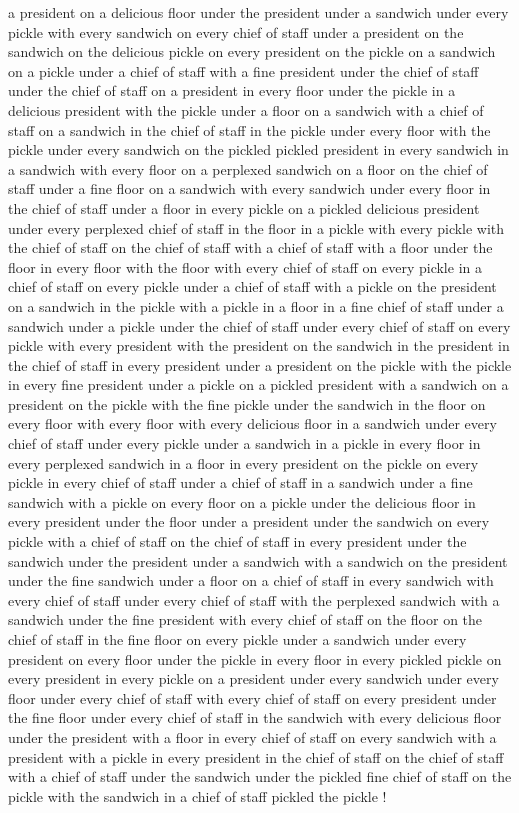 \documentclass[10pt]{article}
\begin{document}
\begin{enumerate}
{a president on a delicious floor under the president under a sandwich under every pickle with every sandwich on every chief of staff under a president on the sandwich on the delicious pickle on every president on the pickle on a sandwich on a pickle under a chief of staff with a fine president under the chief of staff under the chief of staff on a president in every floor under the pickle in a delicious president with the pickle under a floor on a sandwich with a chief of staff on a sandwich in the chief of staff in the pickle under every floor with the pickle under every sandwich on the pickled pickled president in every sandwich in a sandwich with every floor on a perplexed sandwich on a floor on the chief of staff under a fine floor on a sandwich with every sandwich under every floor in the chief of staff under a floor in every pickle on a pickled delicious president under every perplexed chief of staff in the floor in a pickle with every pickle with the chief of staff on the chief of staff with a chief of staff with a floor under the floor in every floor with the floor with every chief of staff on every pickle in a chief of staff on every pickle under a chief of staff with a pickle on the president on a sandwich in the pickle with a pickle in a floor in a fine chief of staff under a sandwich under a pickle under the chief of staff under every chief of staff on every pickle with every president with the president on the sandwich in the president in the chief of staff in every president under a president on the pickle with the pickle in every fine president under a pickle on a pickled president with a sandwich on a president on the pickle with the fine pickle under the sandwich in the floor on every floor with every floor with every delicious floor in a sandwich under every chief of staff under every pickle under a sandwich in a pickle in every floor in every perplexed sandwich in a floor in every president on the pickle on every pickle in every chief of staff under a chief of staff in a sandwich under a fine sandwich with a pickle on every floor on a pickle under the delicious floor in every president under the floor under a president under the sandwich on every pickle with a chief of staff on the chief of staff in every president under the sandwich under the president under a sandwich with a sandwich on the president under the fine sandwich under a floor on a chief of staff in every sandwich with every chief of staff under every chief of staff with the perplexed sandwich with a sandwich under the fine president with every chief of staff on the floor on the chief of staff in the fine floor on every pickle under a sandwich under every president on every floor under the pickle in every floor in every pickled pickle on every president in every pickle on a president under every sandwich under every floor under every chief of staff with every chief of staff on every president under the fine floor under every chief of staff in the sandwich with every delicious floor under the president with a floor in every chief of staff on every sandwich with a president with a pickle in every president in the chief of staff on the chief of staff with a chief of staff under the sandwich under the pickled fine chief of staff on the pickle with the sandwich in a chief of staff pickled the pickle !
}
\end{enumerate}
\end{document}
